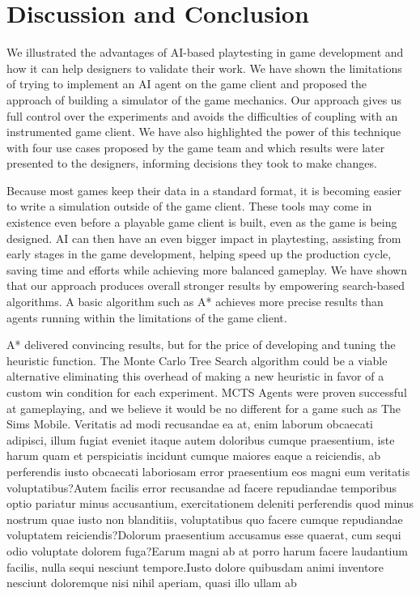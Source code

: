\documentclass[letterpaper]{article} %
\begin{document}
\section{Discussion and Conclusion}

We illustrated the advantages of AI-based playtesting in game development and how it can help designers to validate their work. We have shown the limitations of trying to implement an AI agent on the game client and proposed the approach of building a simulator of the game mechanics. Our approach gives us full control over the experiments and avoids the difficulties of coupling with an instrumented game client. We have also highlighted the power of this technique with four use cases proposed by the game team and which results were later presented to the designers, informing decisions they took to make changes.

Because most games keep their data in a standard format, it is becoming easier to write a simulation outside of the game client. These tools may come in existence even before a playable game client is built, even as the game is being designed. AI can then have an even bigger impact in playtesting, assisting from early stages in the game development, helping speed up the production cycle, saving time and efforts while achieving more balanced gameplay.  We have shown that our approach produces overall stronger results by empowering search-based algorithms. A basic algorithm such as A* achieves more precise results than agents running within the limitations of the game client.

A* delivered convincing results, but for the price of developing and tuning the heuristic function. The Monte Carlo Tree Search algorithm could be a viable alternative eliminating this overhead of making a new heuristic in favor of a custom win condition for each experiment. MCTS Agents were proven successful at gameplaying, and we believe it would be no different for a game such as The Sims Mobile.  Veritatis ad modi recusandae ea at, enim laborum obcaecati adipisci, illum fugiat eveniet itaque autem doloribus cumque praesentium, iste harum quam et perspiciatis incidunt cumque maiores eaque a reiciendis, ab perferendis iusto obcaecati laboriosam error praesentium eos magni eum veritatis voluptatibus?Autem facilis error recusandae ad facere repudiandae temporibus optio pariatur minus accusantium, exercitationem deleniti perferendis quod minus nostrum quae iusto non blanditiis, voluptatibus quo facere cumque repudiandae voluptatem reiciendis?Dolorum praesentium accusamus esse quaerat, cum sequi odio voluptate dolorem fuga?Earum magni ab at porro harum facere laudantium facilis, nulla sequi nesciunt tempore.Iusto dolore quibusdam animi inventore nesciunt doloremque nisi nihil aperiam, quasi illo ullam ab


\end{document}
